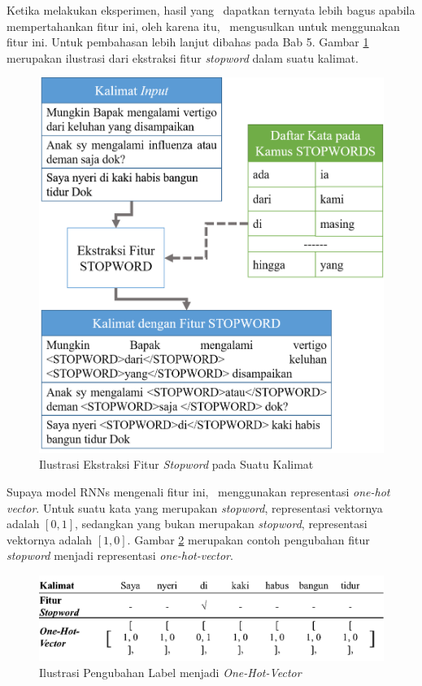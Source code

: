 \begin{enumerate}
	Ketika melakukan eksperimen, hasil yang \saya~dapatkan ternyata lebih bagus apabila mempertahankan fitur ini, oleh karena itu, \saya~mengusulkan untuk menggunakan fitur ini. Untuk pembahasan lebih lanjut dibahas pada Bab 5. Gambar \ref{fig:fiturstopword} merupakan ilustrasi dari ekstraksi fitur \textit{stopword} dalam suatu kalimat.
	
	\begin{figure}
		\centering
		\includegraphics[width=0.70\linewidth]{images/fiturstopword}
		\caption{Ilustrasi Ekstraksi Fitur \textit{Stopword} pada Suatu Kalimat}
		\label{fig:fiturstopword}
	\end{figure}

	Supaya model RNNs mengenali fitur ini, \saya~menggunakan representasi \textit{one-hot vector}. Untuk suatu kata yang merupakan \textit{stopword}, representasi vektornya adalah $ [0, 1] $, sedangkan yang bukan merupakan \textit{stopword}, representasi vektornya adalah $ [1, 0] $. Gambar \ref{fig:stopwordtoone} merupakan contoh pengubahan fitur \textit{stopword} menjadi representasi \textit{one-hot-vector}.
	
	\begin{figure}
		\centering
		\includegraphics[width=0.85\linewidth]{images/stopwordtoone}
		\caption{Ilustrasi Pengubahan Label menjadi \textit{One-Hot-Vector}}
		\label{fig:stopwordtoone}
	\end{figure}


\end{enumerate}
